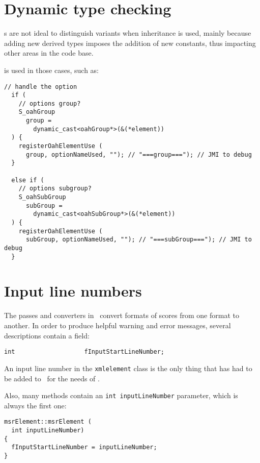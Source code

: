 \section{Dynamic type checking}

\EnumType s are not ideal to distinguish variants when inheritance is used, mainly because adding new derived types imposes the addition of new constants, thus impacting other areas in the code base.

 is used in those cases, such as:
\begin{lstlisting}[language=CPlusPlus]
  // handle the option
  if (
    // options group?
    S_oahGroup
      group =
        dynamic_cast<oahGroup*>(&(*element))
  ) {
    registerOahElementUse (
      group, optionNameUsed, ""); // "===group==="); // JMI to debug
  }

  else if (
    // options subgroup?
    S_oahSubGroup
      subGroup =
        dynamic_cast<oahSubGroup*>(&(*element))
  ) {
    registerOahElementUse (
      subGroup, optionNameUsed, ""); // "===subGroup==="); // JMI to debug
  }
\end{lstlisting}


\section{Input line numbers}

The passes and converters in \mf\ convert formats of scores from one format to another. In order to produce helpful warning and error messages, several descriptions contain a field:
\begin{lstlisting}[language=CPlusPlus]
    int                   fInputStartLineNumber;
\end{lstlisting}

An input line number in the {\tt xmlelement} class   is the only thing that has had to be added to \libmusicxml\ for the needs of \mf.

Also, many methods contain an {\tt int inputLineNumber} parameter, which is always the first one:
\begin{lstlisting}[language=CPlusPlus]
msrElement::msrElement (
  int inputLineNumber)
{
  fInputStartLineNumber = inputLineNumber;
}
\end{lstlisting}

